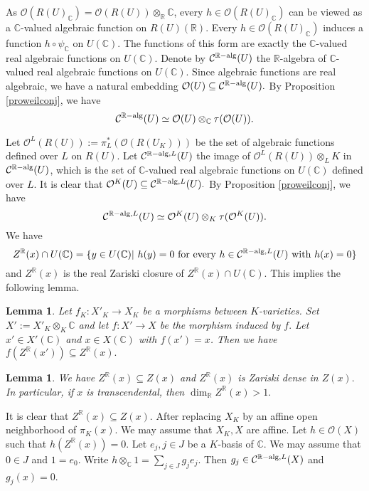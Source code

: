 \documentclass[12pt]{amsart}
\theoremstyle{plain}
\newtheorem{Lem}[Thm]{Lemma}
\theoremstyle{remark}
\theoremstyle{definition}
\def\R{\mathbb R}
\def\C{\mathbb C}
\def\sC{\mathcal C}
\def\sO{\mathcal O}
\def\alg{{\rm alg}}
\begin{document}
As $\sO(R(U)_{\C})=\sO(R(U))\otimes_{\R}\C$, every $h\in \sO(R(U)_{\C})$ can be viewed as a $\C$-valued algebraic function on $R(U)(\R).$
Every $h\in \sO(R(U)_{\C})$ induces a function $h\circ \psi_{\C}$ on $U(\C).$ The functions of this form are exactly the $\C$-valued real algebraic functions on $U(\C)$.
Denote by $\sC^{\R-\alg}(U)$ the $\R$-algebra of $\C$-valued real algebraic functions on $U(\C).$
Since algebraic functions are real algebraic, we have a natural embedding $\sO(U)\subseteq \sC^{\R-\alg}(U).$
By Proposition \ref{proweilconj}, we have 
$$\sC^{\R-\alg}(U)\simeq \sO(U)\otimes_{\C}\tau(\sO(U)).$$



Let $\sO^L(R(U)):=\pi_L^*(\sO(R(U_K)))$ be the set of algebraic functions defined over $L$ on $R(U).$
Let $\sC^{\R-\alg,L}(U)$ the image of $\sO^L(R(U))\otimes_LK$ in $\sC^{\R-\alg}(U)$, which is the set of $\C$-valued real algebraic functions on $U(\C)$ defined over $L.$
It is clear that $\sO^K(U)\subseteq \sC^{\R-\alg, L}(U).$
By Proposition \ref{proweilconj}, we have 
$$\sC^{\R-\alg,L}(U)\simeq \sO^K(U)\otimes_{K}\tau(\sO^K(U)).$$
We have $$Z^{\R}(x)\cap U(\C)=\{y\in U(\C)|\,\, h(y)=0 \text{ for every } h\in \sC^{\R-\alg,L}(U) \text{ with } h(x)=0\}$$ and $Z^{\R}(x)$ is the real Zariski closure of $Z^{\R}(x)\cap U(\C).$
This implies the following lemma.
\begin{Lem}\label{lemmorphismzx}Let $f_K: X'_K\to X_K$ be a morphisms between $K$-varieties. 
Set $X':=X'_K\otimes_K \C$ and let $f: X'\to X$ be the morphism induced by $f.$
Let $x'\in X'(\C)$ and $x\in X(\C)$ with $f(x')=x$. Then we have $f(Z^{\R}(x'))\subseteq Z^{\R}(x).$
\end{Lem}







\begin{Lem}\label{lemcomparezzr}We have $Z^{\R}(x)\subseteq Z(x)$ and $Z^{\R}(x)$ is Zariski dense in $Z(x).$
In particular, if $x$ is transcendental, then $\dim_{\R} Z^{\R}(x)>1.$
\end{Lem}
\proof
It is clear that $Z^{\R}(x)\subseteq Z(x)$.
After replacing $X_K$ by an affine open neighborhood of $\pi_K(x)$. 
We may assume that $X_K, X$ are affine. 
Let $h\in \sO(X)$ such that $h(Z^{\R}(x))=0.$
Let $e_j, j\in J$ be a $K$-basis of $\C$.  We may assume that $0\in J$ and $1=e_0.$
Write 
$h\otimes_{\C} 1=\sum_{j\in J}g_je_j$. Then
$g_j\in  \sC^{\R-\alg,L}(X)$ and $g_j(x)=0$.
\end{document}
